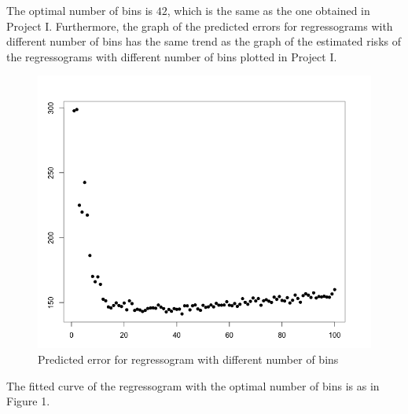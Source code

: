 \documentclass[12pt]{article}
\begin{document}
The optimal number of bins is $42$, which is the same as the one obtained in Project I. Furthermore, the graph of the predicted errors for regressograms with different number of bins has the same trend as the graph of the estimated risks of the regressograms with different number of bins plotted in Project I.
\begin{figure}
\begin{center}
\caption{Predicted error for regressogram with different number of bins}
\includegraphics[scale=0.50]{regressogram find the optimal}
\end{center}
\end{figure}
The fitted curve of the regressogram with the optimal number of bins is as in Figure 1.
\end{document}
